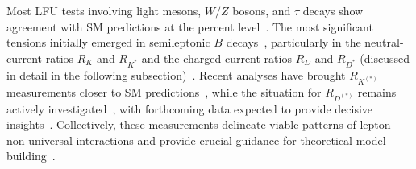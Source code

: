 Most LFU tests involving light mesons, $W/Z$ bosons, and $\tau$ decays show agreement with SM predictions at the percent level~\parencite{1674-1137-40-10-100001}. The most significant tensions initially emerged in semileptonic $B$ decays~\cite{Hiller:2014yaa,Buttazzo:2017ixm,Capdevila_2018,Alonso:2015sja,Calibbi:2015kma}, particularly in the neutral-current ratios $R_K$ and $R_{K^*}$ and the charged-current ratios $R_D$ and $R_{D^*}$ (discussed in detail in the following subsection)~\cite{Altmannshofer_2015,Capdevila_2018}. Recent analyses have brought $R_{K^{(*)}}$ measurements closer to SM predictions~\parencite{LHCb:2022qnv,LHCb:2022zom,Greljo:2022jac,Ciuchini:2022wbq}, while the situation for $R_{D^{(*)}}$ remains actively investigated~\cite{Amhis_2021}, with forthcoming data expected to provide decisive insights~\cite{Belle-II:2018jsg}. Collectively, these measurements delineate viable patterns of lepton non-universal interactions and provide crucial guidance for theoretical model building~\cite{Dorsner:2016wpm,Buttazzo:2017ixm,Angelescu:2018tyl,Cornella:2021sby}.

